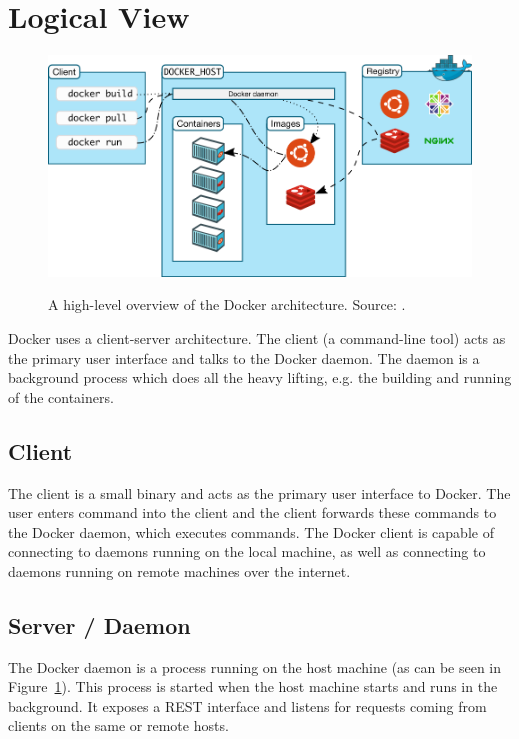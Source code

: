
\section{Logical View}
\label{sec:viewlogical}


\begin{figure}[H]
\caption{A high-level overview of the Docker architecture. Source: \cite{dockerarchi}.}
\centering
\includegraphics[scale=0.4]{4-softwarearch/images/architecture.png}
\label{fig:dockerarchipic}
\end{figure}
Docker uses a client-server architecture. The client (a command-line tool) acts as the primary user interface and talks to the Docker daemon. The daemon is a background process which does all the heavy lifting, e.g. the building and running of the containers.

\subsection{Client}
The client is a small binary and acts as the primary user interface to Docker. The user enters command into the client and the client forwards these commands to the Docker daemon, which executes commands.
The Docker client is capable of connecting to daemons running on the local machine, as well as connecting to daemons running on remote machines over the internet.

\subsection{Server / Daemon}
The Docker daemon is a process running on the host machine (as can be seen in Figure~\ref{fig:dockerarchipic}). This process is started when the host machine starts and runs in the background. It exposes a REST interface and listens for requests coming from clients on the same or remote hosts.

